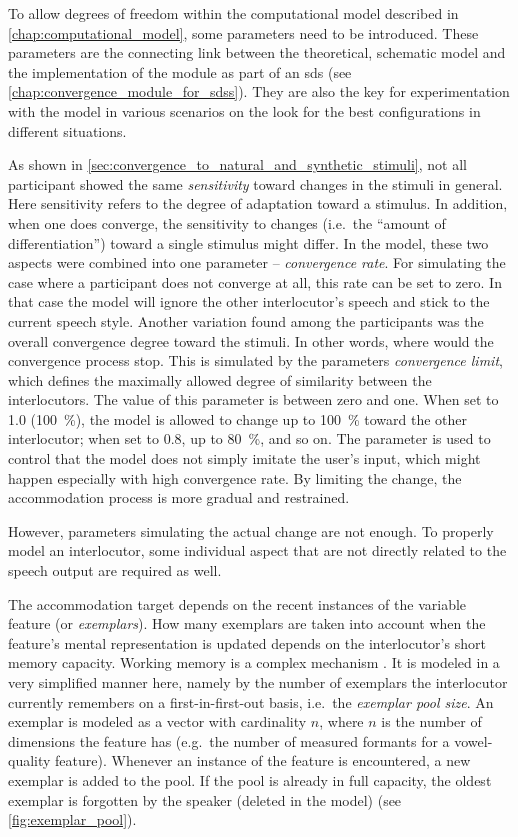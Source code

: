To allow degrees of freedom within the computational model described in \cref{chap:computational_model}, some parameters need to be introduced.
These parameters are the connecting link between the theoretical, schematic model and the implementation of the module as part of an \acs{sds} (see \cref{chap:convergence_module_for_sdss}).
They are also the key for experimentation with the model in various scenarios on the look for the best configurations in different situations.

As shown in \cref{sec:convergence_to_natural_and_synthetic_stimuli}, not all participant showed the same \textit{sensitivity} toward changes in the stimuli in general.
Here sensitivity refers to the degree of adaptation toward a stimulus.
In addition, when one does converge, the sensitivity to changes (i.e.~the \enquote{amount of differentiation}) toward a single stimulus might differ.
In the model, these two aspects were combined into one parameter -- \textit{convergence rate}.
For simulating the case where a participant does not converge at all, this rate can be set to zero.
In that case the model will ignore the other interlocutor's speech and stick to the current speech style.
Another variation found among the participants was the overall convergence degree toward the stimuli.
In other words, where would the convergence process stop.
This is simulated by the parameters \textit{convergence limit}, which defines the maximally allowed degree of similarity between the interlocutors.
The value of this parameter is between zero and one.
When set to 1.0 (\SI{100}{\percent}), the model is allowed to change up to \SI{100}{\percent} toward the other interlocutor; when set to 0.8, up to \SI{80}{\percent}, and so on.
The parameter is used to control that the model does not simply imitate the user's input, which might happen especially with high convergence rate.
By limiting the change, the accommodation process is more gradual and restrained.

However, parameters simulating the actual change are not enough.
To properly model an interlocutor, some individual aspect that are not directly related to the speech output are required as well.

The accommodation target depends on the recent instances of the variable feature (or \textit{exemplars}).
How many exemplars are taken into account when the feature's mental representation is updated depends on the interlocutor's short memory capacity.
Working memory is a complex mechanism
.
It is modeled in a very simplified manner here, namely by the number of exemplars the interlocutor currently remembers on a first-in-first-out basis, i.e.~the \textit{exemplar pool size}.
An exemplar is modeled as a vector with cardinality $n$, where $n$ is the number of dimensions the feature has (e.g.~the number of measured formants for a vowel-quality feature).
Whenever an instance of the feature is encountered, a new exemplar is added to the pool.
If the pool is already in full capacity, the oldest exemplar is forgotten by the speaker (deleted in the model) (see \cref{fig:exemplar_pool}).

